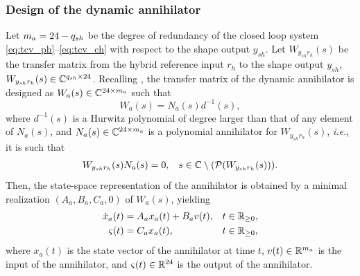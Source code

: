 \subsubsection{Design of the dynamic annihilator}
\label{sec:tcvall_ann}
Let $m_a = 24 - q_{sh}$ be the degree of redundancy of the closed loop system \eqref{eq:tcv_ph}--\eqref{eq:tcv_ch} with respect to the shape output $y_{sh}$. Let $W_{y_{sh}{r_h}}(s)$ be the transfer matrix from the hybrid reference input $r_h$ to the shape output $y_{sh}$, $W_{y_{sh}{r_h}}(s)\in\mathbb{C}^{q_{sh} \times 24}$. Recalling , the transfer matrix of the dynamic annihilator is designed as $W_a(s)\in\mathbb{C}^{24 \times m_a}$ such that
\begin{equation}
  \label{eq:tcvall_ann_cf}
  W_a(s) = N_a(s)d^{-1}(s),
\end{equation}
where $d^{-1}(s)$ is a Hurwitz polynomial of degree larger than that of any element of $N_a(s)$, and $N_a(s)\in\mathbb{C}^{24 \times m_a}$ is a polynomial annihilator for $W_{y_{sh}{r_h}}(s)$, \emph{i.e.}, it is such that
\begin{align}
  \label{eq:tcvall_ann}
  W_{y_{sh}{r_h}}(s)N_a(s) &= 0, & s\in\mathbb{C}\setminus(\operatorname{\mathcal{P}}(W_{y_{sh}{r_h}}(s))).
\end{align}
Then, the state-space representation of the annihilator is obtained by a minimal realization $(A_a,B_a,C_a,0)$ of $W_a(s)$, yielding
\begin{subequations}
  \label{eq:tcvall_ann_ss}
  \begin{align}
    \dot{x}_a(t) &= A_a x_a(t) + B_a v(t), & t\in\mathbb{R}_{\geq 0},\\
    \varsigma(t) &= C_a x_a(t), & t\in\mathbb{R}_{\geq 0},
  \end{align}
\end{subequations}
where $x_a(t)$ is the state vector of the annihilator at time $t$, $v(t)\in\mathbb{R}^{m_a}$ is the input of the annihilator, and $\varsigma(t)\in\mathbb{R}^{24}$ is the output of the annihilator.

